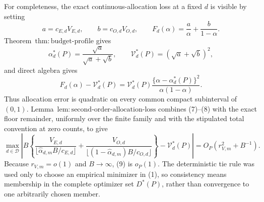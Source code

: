 For completeness, the exact continuous-allocation loss at a fixed \(d\) is visible by setting
\[
 a=c_{E,d}V_{E,d},\qquad b=c_{O,d}V_{O,d},
 \qquad F_d(\alpha)=\frac a\alpha+\frac b{1-\alpha}.
\]
Theorem~\(\mathrm{thm{:}budget\text{-}profile}\) gives
\[
 \alpha_d^*(P)=\frac{\sqrt a}{\sqrt a+\sqrt b},
 \qquad
 \mathcal V_d^*(P)=(\sqrt a+\sqrt b)^2,
\]
and direct algebra gives
\[
 F_d(\alpha)-\mathcal V_d^*(P)
 =\mathcal V_d^*(P)
 \frac{\{\alpha-\alpha_d^*(P)\}^2}{\alpha(1-\alpha)}.            \tag{8}
\]
Thus allocation error is quadratic on every common compact subinterval of \((0,1)\).  Lemma~\(\mathrm{lem{:}second\text{-}order\text{-}allocation\text{-}loss}\) combines (7)--(8) with the exact floor remainder, uniformly over the finite family and with the stipulated total convention at zero counts, to give
\[
\max_{d\in\mathcal D}\left|B\left\{
\frac{V_{E,d}}{\lfloor\widehat\alpha_{d,m}B/c_{E,d}\rfloor}
+\frac{V_{O,d}}{\lfloor(1-\widehat\alpha_{d,m})B/c_{O,d}\rfloor}
\right\}-\mathcal V_d^*(P)\right|
=O_P(r_{V,m}^2+B^{-1}).                                            \tag{9}
\]
Because \(r_{V,m}=o(1)\) and \(B\to\infty\), (9) is \(o_P(1)\).  The deterministic tie rule was used only to choose an empirical minimizer in (1), so consistency means membership in the complete optimizer set \(D^*(P)\), rather than convergence to one arbitrarily chosen member.